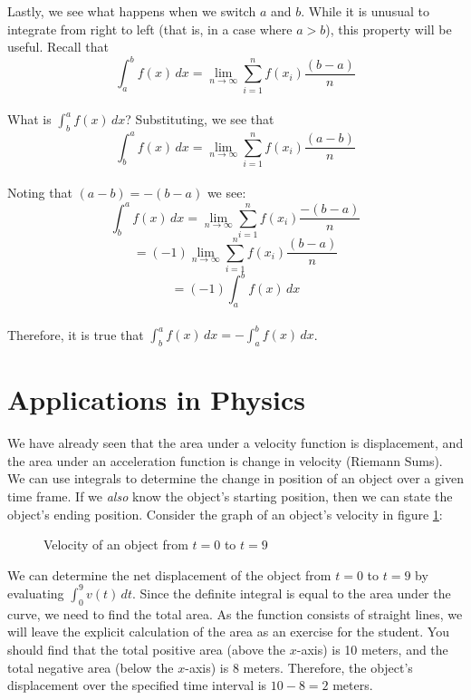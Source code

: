 Lastly, we see what happens when we switch $a$ and $b$. While it is 
unusual to integrate from right to left (that is, in a case where 
$a > b$), this property will be useful. Recall that $$\int_a^b f(x)\,dx 
= \lim_{n \to \infty} \sum_{i = 1}^{n} f(x_i)\frac{(b - a)}{n}$$\\ 
What is $\int_b^a f(x)\,dx$? Substituting, we see that $$\int_b^a f(x)
\,dx =\lim_{n \to \infty} \sum_{i=1}^{n} f(x_i) \frac{(a - b)}{n}$$\\ 
Noting that $(a - b) = -(b - a)$ we see: $$\int_b^a f(x)\,dx = \lim_{n \to 
\infty} \sum_{i = 1}^{n} f(x_i) \frac{-(b - a)}{n}$$ $$=(-1)\lim_{n 
\to \infty} \sum_{i = 1}^{n} f(x_i) \frac{(b - a)}{n}$$ $$=(-1)
\int_a^b f(x)\,dx$$ \\
Therefore, it is true that $\int_b^a f(x)\,dx = -\int_a^b f(x)\,dx$. 

\section{Applications in Physics}
We have already seen that the area under a velocity function is 
displacement, and the area under an acceleration function is change in 
velocity (Riemann Sums). We can use integrals to determine the change 
in position of an object over a given time frame. If we \textit{also} 
know the object's starting position, then we can state the object's 
ending position. Consider the graph of an object's velocity in figure 
\ref{fig:velocity}:

\begin{figure}[htbp]
	\caption{Velocity of an object from $t=0$ to $t=9$}
	\label{fig:velocity}
\end{figure}

We can determine the net displacement of the object from $t = 0$ to 
$t = 9$ by evaluating $\int_{0}^{9} v(t)\, dt$. Since the definite 
integral is equal to the area under the curve, we need to find the 
total area. As the function consists of straight lines, we will leave 
the explicit calculation of the area as an exercise for the student. 
You should find that the total positive area (above the $x$-axis) is 
10 meters, and the total negative area (below the $x$-axis) is 8 meters. 
Therefore, the object's displacement over the specified time interval 
is $10 - 8 = 2$ meters. 

